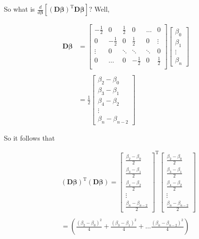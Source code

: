 \documentclass{article}
\newcommand{\B}{\boldsymbol\beta} %
\newcommand{\D}{\mathbf{D}}
\begin{document}
So what is $\frac{d}{d\B} [ (\D\B)^{\textrm{T}}\D\B ] $? Well, 

\begin{align*}
  \D\B &= \begin{bmatrix}
    -\frac{1}{2} & 0 & \frac{1}{2} & 0 & \dots & 0 \\
    0 & -\frac{1}{2} & 0 & \frac{1}{2} & 0 & \vdots \\
    \vdots & 0 & \ddots & \ddots & \ddots & 0 \\
    0 & \dots & 0 & -\frac{1}{2} & 0 & \frac{1}{2} \\ 
  \end{bmatrix} 
  \begin{bmatrix}
  \beta_0 \\
  \beta_1 \\
  \vdots \\
  \beta_n
  \end{bmatrix} \\\\
  &= \frac{1}{2}\begin{bmatrix}
  \beta_2 - \beta_0 \\ 
  \beta_3 - \beta_1 \\ 
  \beta_4 - \beta_2 \\
  \vdots \\
  \beta_n - \beta_{n-2}
  \end{bmatrix}
\end{align*}

So it follows that

\begin{align*}
  &(\D\B)^{\textrm{T}}(\D\B) = 
  \begin{bmatrix}
  \frac{\beta_2 - \beta_0}{2} \\ 
  \frac{\beta_3 - \beta_1}{2} \\ 
  \frac{\beta_4 - \beta_2}{2} \\
  \vdots \\
  \frac{\beta_n - \beta_{n-2}}{2}
  \end{bmatrix} ^ {\textrm{T}}
   \begin{bmatrix}
  \frac{\beta_2 - \beta_0}{2} \\ 
  \frac{\beta_3 - \beta_1}{2} \\ 
  \frac{\beta_4 - \beta_2}{2} \\
  \vdots \\
  \frac{\beta_n - \beta_{n-2}}{2}
  \end{bmatrix} \\\\
  &= \left( \frac{(\beta_2 - \beta_0)^2}{4} + \frac{(\beta_3 - \beta_1)^2}{4} + \dots \frac{(\beta_n - \beta_{n-2})^2}{4} \right)
\end{align*}
\end{document}
